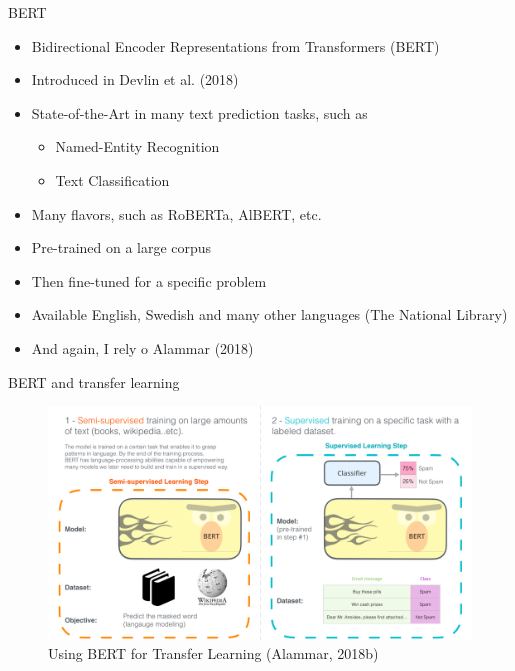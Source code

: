 \documentclass[10pt]{beamer}
\begin{document}
\begin{frame}{BERT}

\begin{itemize}
\item Bidirectional Encoder Representations from Transformers (BERT)
\item Introduced in Devlin et al. (2018)
\pause
\item {\color{uured} State-of-the-Art} in many text prediction tasks, such as
\begin{itemize}
\item Named-Entity Recognition
\item Text Classification
\end{itemize}
\pause
\item Many flavors, such as RoBERTa, AlBERT, etc.
\pause
\item {\color{uured} Pre-trained} on a large corpus
\pause
\item Then {\color{uured} fine-tuned} for a specific problem
\pause
\item Available English, Swedish and many other languages (The National Library)
\pause
\item And again, I rely o Alammar (2018) 
\end{itemize}

\end{frame}


\begin{frame}{BERT and transfer learning}

\begin{figure}[h]
\centering
\includegraphics[width=1\textwidth]{fig/bert-transfer-learning.png}
\caption{Using BERT for Transfer Learning (Alammar, 2018b)}
\end{figure}

\end{frame}
\end{document}

